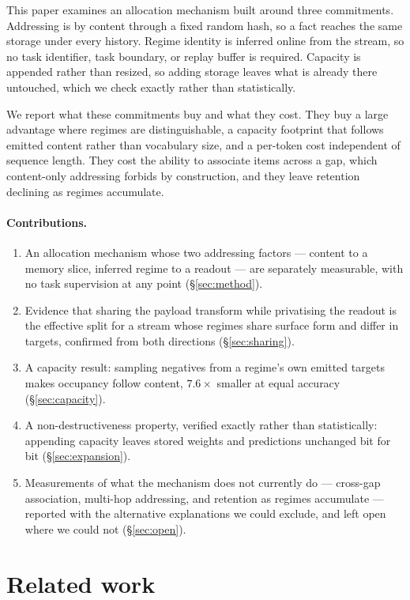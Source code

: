 \documentclass[11pt,a4paper]{article}
\begin{document}
This paper examines an allocation mechanism built around three commitments.
Addressing is by content through a fixed random hash, so a fact reaches the same
storage under every history. Regime identity is inferred online from the stream,
so no task identifier, task boundary, or replay buffer is required. Capacity is
appended rather than resized, so adding storage leaves what is already there
untouched, which we check exactly rather than statistically.

We report what these commitments buy and what they cost. They buy a large
advantage where regimes are distinguishable, a capacity footprint that follows
emitted content rather than vocabulary size, and a per-token cost independent of
sequence length. They cost the ability to associate items across a gap, which
content-only addressing forbids by construction, and they leave retention
declining as regimes accumulate.

\paragraph{Contributions.}
\begin{enumerate}
  \item An allocation mechanism whose two addressing factors --- content to a
  memory slice, inferred regime to a readout --- are separately measurable, with
  no task supervision at any point (\S\ref{sec:method}).
  \item Evidence that sharing the payload transform while privatising the
  readout is the effective split for a stream whose regimes share surface form and
  differ in targets, confirmed from both directions (\S\ref{sec:sharing}).
  \item A capacity result: sampling negatives from a regime's own emitted
  targets makes occupancy follow content, $7.6\times$ smaller at equal accuracy
  (\S\ref{sec:capacity}).
  \item A non-destructiveness property, verified exactly rather than
  statistically: appending capacity leaves stored weights and predictions
  unchanged bit for bit (\S\ref{sec:expansion}).
  \item Measurements of what the mechanism does not currently do --- cross-gap
  association, multi-hop addressing, and retention as regimes accumulate ---
  reported with the alternative explanations we could exclude, and left open
  where we could not (\S\ref{sec:open}).
\end{enumerate}

\section{Related work}
\end{document}
